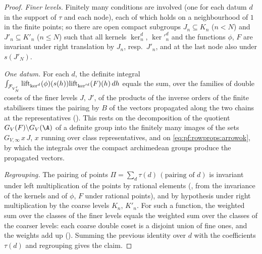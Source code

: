 \begin{proof}
\emph{Finer levels.} Finitely many conditions are involved (one for each datum $d$ in the support of $\tau$ and each node),
each of which holds on a neighbourhood of $1$ in the finite points; so there are open compact subgroups $J_n\subseteq K_n$
($n<N$) and $J'_n\subseteq K'_n$ ($n\le N$) such that all kernels $\ker^d_n$, $\ker'^d_n$ and the functions $\phi$, $F$ are
invariant under right translation by $J_n$, resp.\ $J'_n$, and at the last node also under $s(J'_N)$.

\emph{One datum.} For each $d$, the definite integral $\int_{\mathcal{F}_{V'_N}}\mathrm{lift}_{\ker^d}(\phi)(s(h))
\mathrm{lift}_{\ker'^d}(F)(h)\,dh$ equals the sum, over the families of double cosets of the finer levels $J$, $J'$, of the
products of the inverse orders of the finite stabilisers times the pairing by $B$ of the vectors propagated along the two
chains at the representatives (). This rests on the decomposition of the quotient
$G_V(F)\backslash G_V(\A)$ of a definite group into the finitely many images of the sets $G_{V,\infty}\,x\,J$, $x$ running over
class representatives, and on \eqref{eq:pf:rowprops:arrowok}, by which the integrals over the compact archimedean groups
produce the propagated vectors.

\emph{Regrouping.} The pairing of points $\Pi=\sum_d\tau(d)\,(\text{pairing of } d)$ is invariant under left multiplication
of the points by rational elements (, from the invariance of the kernels and of $\phi$,
$F$ under rational points), and by hypothesis under right multiplication by the coarse levels $K_n$, $K'_n$. For such a
function, the weighted sum over the classes of the finer levels equals the weighted sum over the classes of the coarser
levels: each coarse double coset is a disjoint union of fine ones, and the weights add up
(). Summing the previous identity over $d$ with the coefficients
$\tau(d)$ and regrouping gives the claim.
\end{proof}

